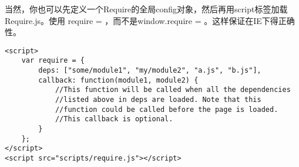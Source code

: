     当然，你也可以先定义一个Require的全局config对象，然后再用script标签加载Require.js。使用 require = {}，而不是window.require = {}。这样保证在IE下得正确性。

    \begin{lstlisting}
<script>
    var require = {
        deps: ["some/module1", "my/module2", "a.js", "b.js"],
        callback: function(module1, module2) {
            //This function will be called when all the dependencies
            //listed above in deps are loaded. Note that this
            //function could be called before the page is loaded.
            //This callback is optional.
        }
    };
</script>
<script src="scripts/require.js"></script>
    \end{lstlisting}

